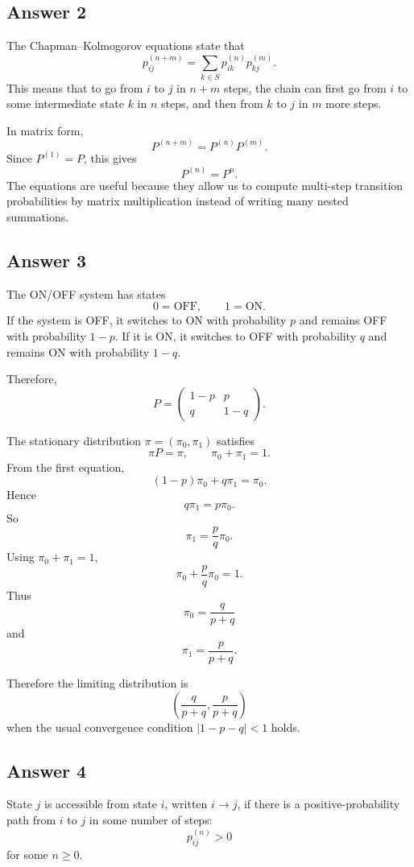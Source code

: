 \documentclass[12pt,a4paper]{article}
\theoremstyle{lecturestyle}
\begin{document}
\subsection*{Answer 2}

The Chapman--Kolmogorov equations state that
\[
p_{ij}^{(n+m)}
=
\sum_{k\in S}p_{ik}^{(n)}p_{kj}^{(m)}.
\]
This means that to go from $i$ to $j$ in $n+m$ steps, the chain can first go from $i$ to some intermediate state $k$ in $n$ steps, and then from $k$ to $j$ in $m$ more steps.

In matrix form,
\[
P^{(n+m)}=P^{(n)}P^{(m)}.
\]
Since $P^{(1)}=P$, this gives
\[
P^{(n)}=P^n.
\]
The equations are useful because they allow us to compute multi-step transition probabilities by matrix multiplication instead of writing many nested summations.

\subsection*{Answer 3}

The ON/OFF system has states
\[
0=\text{OFF},\qquad 1=\text{ON}.
\]
If the system is OFF, it switches to ON with probability $p$ and remains OFF with probability $1-p$. If it is ON, it switches to OFF with probability $q$ and remains ON with probability $1-q$.

Therefore,
\[
P=
\begin{pmatrix}
1-p & p\\
q & 1-q
\end{pmatrix}.
\]

The stationary distribution $\pi=(\pi_0,\pi_1)$ satisfies
\[
\pi P=\pi,
\qquad
\pi_0+\pi_1=1.
\]
From the first equation,
\[
(1-p)\pi_0+q\pi_1=\pi_0.
\]
Hence
\[
q\pi_1=p\pi_0.
\]
So
\[
\pi_1=\frac{p}{q}\pi_0.
\]
Using $\pi_0+\pi_1=1$,
\[
\pi_0+\frac{p}{q}\pi_0=1.
\]
Thus
\[
\pi_0=\frac{q}{p+q}
\]
and
\[
\pi_1=\frac{p}{p+q}.
\]

Therefore the limiting distribution is
\[
\boxed{\left(\frac{q}{p+q},\frac{p}{p+q}\right)}
\]
when the usual convergence condition $|1-p-q|<1$ holds.

\subsection*{Answer 4}

State $j$ is accessible from state $i$, written $i\to j$, if there is a positive-probability path from $i$ to $j$ in some number of steps:
\[
p_{ij}^{(n)}>0
\]
for some $n\geq0$.
\end{document}
